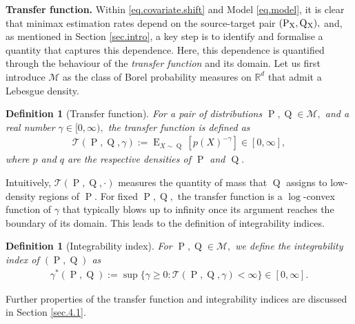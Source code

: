 \documentclass[10pt]{article}
\newcommand{\mM}{\mathcal{M}}
\newcommand{\mT}{\mathcal{T}}
\newcommand{\RR}{\mathbb{R}}
\newcommand{\E}{\operatorname{E}}
\renewcommand{\P}{\operatorname{P}}
\newcommand{\Q}{\operatorname{Q}}
\newcommand{\sX}{\mathrm{X}}
\newtheorem{definition}[theorem]{Definition}
\begin{document}
\noindent\textbf{Transfer function.} Within \eqref{eq.covariate.shift} and Model \eqref{eq.model}, it is clear that minimax estimation rates depend on the source-target pair $(\P_{\sX}, \Q\mathstrut_{\!\sX}),$ and, as mentioned in Section \ref{sec.intro}, a key step is to identify and formalise a quantity that captures this dependence. Here, this dependence is quantified through the behaviour of the \textit{transfer function} and its domain. Let us first introduce $\mM$ as the class of Borel probability measures on $\RR^d$ that admit a Lebesgue density.
\begin{definition}[Transfer function]
    For a pair of distributions $\P, \Q \in \mM,$ and a real number $\gamma \in [0, \infty),$ the transfer function is defined as
    \begin{align*}
        \mT(\P, \Q, \gamma) := \E_{X \sim \Q}[p(X)^{-\gamma}] \in [0, \infty],
    \end{align*}
    where $p$ and $q$ are the respective densities of $\P$ and $\Q.$
\end{definition}
Intuitively, $\mT(\P, \Q, \cdot)$ measures the quantity of mass that $\Q$ assigns to low-density regions of $\P.$ For fixed $\P, \Q,$ the transfer function is a $\log$-convex function of $\gamma$ that typically blows up to infinity once its argument reaches the boundary of its domain. This leads to the definition of integrability indices.
\begin{definition}[Integrability index]
    For $\P, \Q \in \mM,$ we define the integrability index of $(\P, \Q)$ as
    \begin{align*}
        \gamma^*(\P, \Q) := \sup\{\gamma \geq 0: \mT(\P, \Q, \gamma) < \infty\} \in [0, \infty].
    \end{align*}
\end{definition}
Further properties of the transfer function and integrability indices are discussed in Section \ref{sec.4.1}.\\
\end{document}
